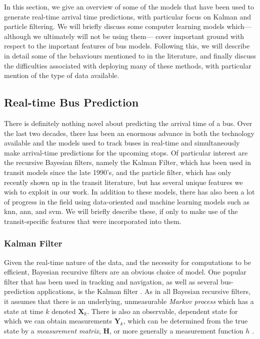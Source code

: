 \documentclass[12pt,a4paper]{article}
\newcommand{\bY}{\mathbf{Y}}
\newcommand{\bX}{\mathbf{X}}
\newcommand{\mat}[1]{\mathbf{#1}}
\newcommand{\kf}{Kalman filter}
\begin{document}
In this section, we give an overview of some of the models that have been used
to generate real-time arrival time predictions,
with particular focus on Kalman and particle filtering.
We will briefly discuss some computer learning models which---%
although we ultimately will not be using them---%
cover important ground with respect to the important features of bus models.
Following this, we will describe in detail some of the
behaviours mentioned to in the literature,
and finally discuss the difficulties associated with deploying many of these methods,
with particular mention of the type of data available.


\subsection{Real-time Bus Prediction}
\label{sec:history}

There is definitely nothing novel about predicting the arrival time of a bus.
Over the last two decades,
there has been an enormous advance in both the technology available and the models used
to track buses in real-time and simultaneously make arrival-time predictions for the upcoming stops.
Of particular interest are the recursive Bayesian filters,
namely the Kalman Filter, which has been used in transit models since the late 1990's,
and the particle filter, which has only recently shown up in the transit literature,
but has several unique features we wish to exploit in our work.
In addition to these models,
there has also been a lot of progress in the field using data-oriented and machine learning models
such as \gls{knn}, \gls{ann}, and \gls{svm}.
We will briefly describe these, if only to make use of the transit-specific features
that were incorporated into them.



\subsubsection{Kalman Filter}
\label{sec:kalman-filter}

Given the real-time nature of the data, and the necessity for computations to be efficient,
Bayesian recursive filters are an obvious choice of model.
One popular filter that has been used in tracking and navigation,
as well as several bus-prediction applications,
is the \kf{} \citep{wall-dailey:1999,dailey:2001,cn}.
As in all Bayesian recursive filters,
it assumes that there is an underlying, unmeasurable \emph{Markov process}
which has a state at time $k$ denoted $\bX_k$.
There is also an observable, dependent state for which we can obtain measurements $\bY_k$,
which can be determined from the true state by a \emph{measurement matrix}, $\mat{H}$,
or more generally a measurement function $h$
\citep{jazwinski:1970}.
\end{document}

